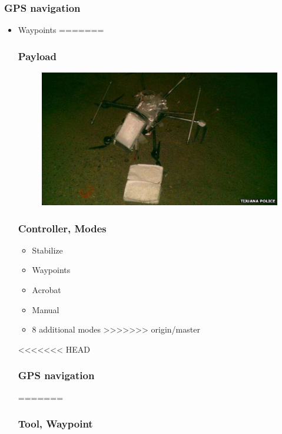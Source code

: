 \begin{frame}
\frametitle{GPS navigation}

  \begin{itemize}
    \item Waypoints    
=======
\begin{frame}
\frametitle{Payload}

  \begin{figure}
  \includegraphics[scale=0.6]{pic/03_our-copter/drug.jpg}
  \end{figure}
  
\end{frame}



\begin{frame}
\frametitle{Controller, Modes}

  \begin{itemize}
    \item Stabilize    
    \item Waypoints   
	\item Acrobat
	\item Manual 
	\item 8 additional modes 
>>>>>>> origin/master
  \end{itemize}
  
\end{frame}


<<<<<<< HEAD
\begin{frame}
\frametitle{GPS navigation}

=======

\begin{frame}
\frametitle{Tool, Waypoint}


\end{frame}
\end{frame}
\end{itemize}
\end{frame}
